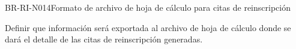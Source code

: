 \begin{BusinessRule}{BR-RI-N014}{Formato de archivo de hoja de cálculo para citas de reinscripción}
		
%	
	\BRItem[Motivación] Definir que información será exportada al archivo de hoja de cálculo donde se dará el detalle de las citas de reinscripción generadas.
\end{BusinessRule}

